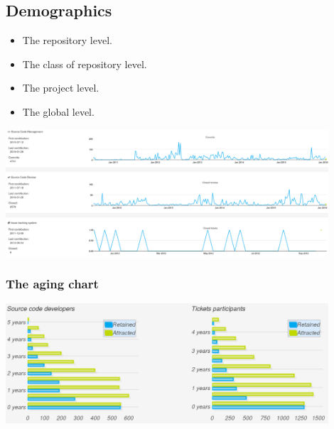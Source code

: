 \documentclass[17pt,aspectratio=169,hyperref=pdfusetitle]{beamer}
\begin{document}
\subsection{Demographics}


\begin{frame}

  \begin{itemize}
  \item The repository level.
  \item The class of repository level.
  \item The project level.
  \item The global level.
  \end{itemize}

\begin{center}
  \includegraphics[width=12cm]{figs/person-profile}
\end{center}

\end{frame}


\begin{frame}
\frametitle{The aging chart}

\begin{center}
  \includegraphics[width=12cm]{figs/aging-openstack}
\end{center}

\end{frame}
\end{document}
